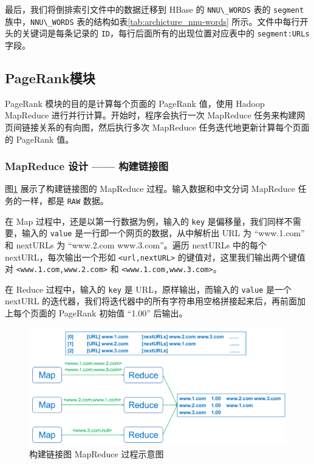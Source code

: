 \documentclass{ctexart}
\newcommand{\code}[1]{\colorbox{backcolor}{\lstinline|#1|}}
\begin{document}
    最后，我们将倒排索引文件中的数据迁移到 HBase 的 \code{NNU\_WORDS} 表的 \code{segment} 族中，\code{NNU\_WORDS} 表的结构如表\ref{tab:archicture_nnu-words} 所示。文件中每行开头的关键词是每条记录的 \code{ID}，每行后面所有的出现位置对应表中的 \code{segment:URLs} 字段。

    \subsection{PageRank模块}\label{subsec:pagerank}

    PageRank 模块的目的是计算每个页面的 PageRank 值，使用 Hadoop MapReduce 进行并行计算。开始时，程序会执行一次 MapReduce 任务来构建网页间链接关系的有向图，然后执行多次 MapReduce 任务迭代地更新计算每个页面的 PageRank 值。

    \subsubsection{MapReduce 设计 —— 构建链接图}\label{subsubsec:pagerank_build}

    图\ref{fig:pagerank_build-graph} 展示了构建链接图的 MapReduce 过程。输入数据和中文分词 MapReduce 任务的一样，都是 \code{RAW} 数据。

    在 Map 过程中，还是以第一行数据为例，输入的 \code{key} 是偏移量，我们同样不需要，输入的 \code{value} 是一行即一个网页的数据，从中解析出 URL 为 “www.1.com” 和 nextURLs 为 “www.2.com www.3.com”。遍历 nextURLs 中的每个 nextURL，每次输出一个形如 \code{<url,nextURL>} 的键值对，这里我们输出两个键值对 \code{<www.1.com,www.2.com>} 和 \code{<www.1.com,www.3.com>}。

    在 Reduce 过程中，输入的 \code{key} 是 URL，原样输出，而输入的 \code{value} 是一个 nextURL 的迭代器，我们将迭代器中的所有字符串用空格拼接起来后，再前面加上每个页面的 PageRank 初始值 “1.00” 后输出。

    \begin{figure}[t]
        \centering
        \includegraphics[width=\textwidth]{src/pagerank_build-graph}
        \caption{构建链接图 MapReduce 过程示意图}
        \label{fig:pagerank_build-graph}
    \end{figure}
\end{document}
